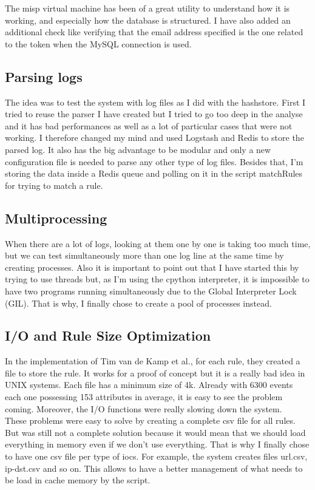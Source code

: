 \documentclass{eplmastersthesis}
\begin{document}
The \gls{misp} virtual machine has been of a great utility to understand how it is working, and especially how the database is structured. I have also added an additional check like verifying that the email address specified is the one related to the token when the MySQL connection is used.

\subsection{Parsing logs}
The idea was to test the system with log files as I did with the hashstore. First I tried to reuse the parser I have created but I tried to go too deep in the analyse and it has bad performances as well as a lot of particular cases that were not working.
I therefore changed my mind and used Logstash and Redis to store the parsed log. 
It also has the big advantage to be modular and only a new configuration file is needed to parse any other type of log files.
Besides that, I'm storing the data inside a Redis queue and polling on it in the script matchRules for trying to match a rule. \\

\subsection{Multiprocessing}
When there are a lot of logs, looking at them one by one is taking too much time, but we can test simultaneously more than one log line at the same time by creating processes.
Also it is important to point out that I have started this by trying to use threads but, as I'm using the cpython interpreter, it is impossible to have two programs running simultaneously due to the Global Interpreter Lock (GIL). That is why, I finally chose to create a pool of processes instead.

\subsection{I/O and Rule Size Optimization}
In the implementation of Tim van de Kamp et al., for each rule, they created a file to store the rule. 
It works for a proof of concept but it is a really bad idea in UNIX systems. Each file has a minimum size of 4k. Already with 6300 events each one possessing 153 attributes in average, it is easy to see the problem coming. Moreover, the I/O functions were really slowing down the system.\\

These problems were easy to solve by creating a complete \gls{csv} file for all rules. But was still not a complete solution because it would mean that we should load everything in memory even if we don't use everything. That is why I finally chose to have one \gls{csv} file per type of \gls{ioc}s. For example, the system creates files url.csv, ip-dst.csv and so on. This allows to have a better management of what needs to be load in cache memory by the script.
\end{document}
